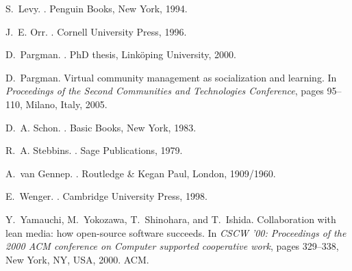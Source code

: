 \documentclass{sig-alt-release2}
\begin{document}
\begin{thebibliography}{10}
S.~Levy.
.
\newblock Penguin Books, New York, 1994.

J.~E. Orr.
.
\newblock Cornell University Press, 1996.

D.~Pargman.
.
\newblock PhD thesis, Link\"oping University, 2000.

D.~Pargman.
\newblock Virtual community management as socialization and learning.
\newblock In {\em Proceedings of the Second Communities and Technologies
  Conference}, pages 95--110, Milano, Italy, 2005.

D.~A. Schon.
.
\newblock Basic Books, New York, 1983.

R.~A. Stebbins.
.
\newblock Sage Publications, 1979.

A.~van Gennep.
.
\newblock Routledge \& Kegan Paul, London, 1909/1960.

E.~Wenger.
.
\newblock Cambridge University Press, 1998.

Y.~Yamauchi, M.~Yokozawa, T.~Shinohara, and T.~Ishida.
\newblock Collaboration with lean media: how open-source software succeeds.
\newblock In {\em CSCW '00: Proceedings of the 2000 ACM conference on Computer
  supported cooperative work}, pages 329--338, New York, NY, USA, 2000. ACM.

\end{thebibliography}

\balancecolumns
\end{document}
